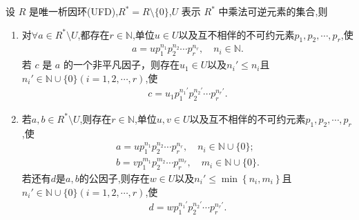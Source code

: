 \documentclass[../../main.tex]{subfiles}%
\begin{document}
\begin{theorem}\label{theorem:有限析因条件推出标准分解}
设 \( R \) 是唯一析因环(UFD),\( R^* = R \setminus \{0\} \),\( U \) 表示 \( R^* \) 中乘法可逆元素的集合,则
\begin{enumerate}[(1)]
\item\label{theorem:有限析因条件推出标准分解-1} 对$\forall a\in R^*\setminus U$,都存在$r\in \mathbb{N}$,单位$u\in U$以及互不相伴的不可约元素$p_1,p_2,\cdots,p_r$,使
\begin{align*}
a = up_1^{n_1}p_2^{n_2}\cdots p_r^{n_r}, \quad n_i \in \mathbb{N}.
\end{align*}
若 \( c \) 是 \( a \) 的一个非平凡因子，则存在$u_1\in U$以及$n_i'\leqslant n_i$且$n_i'\in \mathbb{N}\cup\{0\}(i=1,2,\cdots,r)$,使
\begin{align*}
c = u_1p_1^{n_1'}p_2^{n_2'}\cdots p_r^{n_r'}.
\end{align*}

\item\label{theorem:有限析因条件推出标准分解-2} 若$a,b\in R^*\setminus U$,则存在$r\in \mathbb{N}$,单位$u,v\in U$以及互不相伴的不可约元素$p_1,p_2,\cdots,p_r$,使
\begin{gather*}
a=up_{1}^{n_1}p_{2}^{n_2}\cdots p_{r}^{n_r},\quad n_i\in \mathbb{N}\cup \{0\};
\\
b=vp_1^{m_1}p_2^{m_2}\cdots p_r^{m_r}, \quad m_i \in \mathbb{N}\cup \{0\}.
\end{gather*}
若还有$d$是$a,b$的公因子,则存在$w\in U$以及$n_i'\leqslant \min \left\{ n_i,m_i \right\} $且$n_i'\in \mathbb{N}\cup\{0\}(i=1,2,\cdots,r)$,使
\begin{align*}
d = wp_1^{n_1'}p_2^{n_2'}\cdots p_r^{n_r'}.
\end{align*}
\end{enumerate}
\end{theorem}
\end{document}

